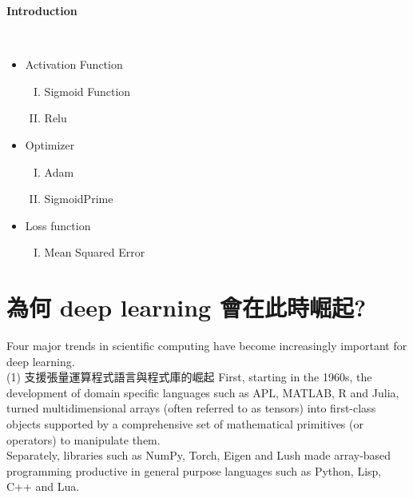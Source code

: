 \documentclass[12pt,a4paper]{article}
\title{}
\author{虎尾科技大學\\40723115\\ 林于哲}
\date{April 1 2021}
\begin{document}
\maketitle
\tableofcontents

\newpage
\begin{huge}\textbf{Introduction}\end{huge}\\
\begin{itemize}
\item Activation Function 
   \begin{enumerate}[I.]
   \item Sigmoid Function
   \item Relu
   \end{enumerate}
\end{itemize}   
\begin{itemize}
\item Optimizer
   \begin{enumerate}[I.]
   \item Adam
   \item SigmoidPrime
   \end{enumerate}
\end{itemize}  
\begin{itemize}   
\item Loss function
   \begin{enumerate}[I.]
   \item Mean Squared Error
   \end{enumerate}
\end{itemize} 
\section{為何 deep learning 會在此時崛起?}
Four major trends in scientific computing have become increasingly important for deep learning.\\

(1) 支援張量運算程式語言與程式庫的崛起 First, starting in the 1960s, the development of domain specific languages such as APL, MATLAB, R and Julia, turned multidimensional arrays (often referred to as tensors) into first-class objects supported by a comprehensive set of mathematical primitives (or operators) to manipulate them.\\
Separately, libraries such as NumPy, Torch, Eigen and Lush made array-based programming productive in general purpose languages such as Python, Lisp, C++ and Lua.\\
\end{document}
